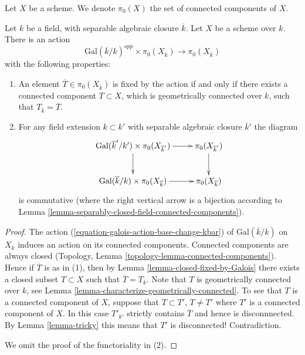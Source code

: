 \noindent
Let $X$ be a scheme. We denote $\pi_0(X)$ the set of connected
components of $X$.

\begin{lemma}
\label{lemma-galois-action-connected-components}
Let $k$ be a field, with separable algebraic closure $\overline{k}$.
Let $X$ be a scheme over $k$.
There is an action
$$
\text{Gal}(\overline{k}/k)^{opp} \times \pi_0(X_{\overline{k}})
\longrightarrow
\pi_0(X_{\overline{k}})
$$
with the following properties:
\begin{enumerate}
\item An element $\overline{T} \in \pi_0(X_{\overline{k}})$
is fixed by the action if and only if there exists a connected component
$T \subset X$, which is geometrically connected over $k$,
such that $T_{\overline{k}} = \overline{T}$.
\item For any field extension $k \subset k'$ with separable
algebraic closure $\overline{k}'$ the diagram
$$
\xymatrix{
\text{Gal}(\overline{k}'/k') \times \pi_0(X_{\overline{k}'})
\ar[r] \ar[d] &
\pi_0(X_{\overline{k}'}) \ar[d] \\
\text{Gal}(\overline{k}/k) \times \pi_0(X_{\overline{k}})
\ar[r] &
\pi_0(X_{\overline{k}})
}
$$
is commutative (where the right vertical arrow is a bijection
according to Lemma \ref{lemma-separably-closed-field-connected-components}).
\end{enumerate}
\end{lemma}

\begin{proof}
The action (\ref{equation-galois-action-base-change-kbar})
of $\text{Gal}(\overline{k}/k)$ on $X_{\overline{k}}$
induces an action on its connected components.
Connected components are always closed
(Topology, Lemma \ref{topology-lemma-connected-components}).
Hence if $\overline{T}$ is as in (1), then by
Lemma \ref{lemma-closed-fixed-by-Galois} there exists a closed
subset $T \subset X$ such that $\overline{T} = T_{\overline{k}}$.
Note that $T$ is geometrically connected over $k$, see
Lemma \ref{lemma-characterize-geometrically-connected}.
To see that $T$ is a connected component of $X$, suppose that
$T \subset T'$, $T \not = T'$ where $T'$ is a connected component of $X$.
In this case $T'_{k'}$ strictly contains $\overline{T}$ and hence is
disconnnected. By Lemma \ref{lemma-tricky} this means that $T'$ is
disconnected! Contradiction.

\medskip\noindent
We omit the proof of the functoriality in (2).
\end{proof}

